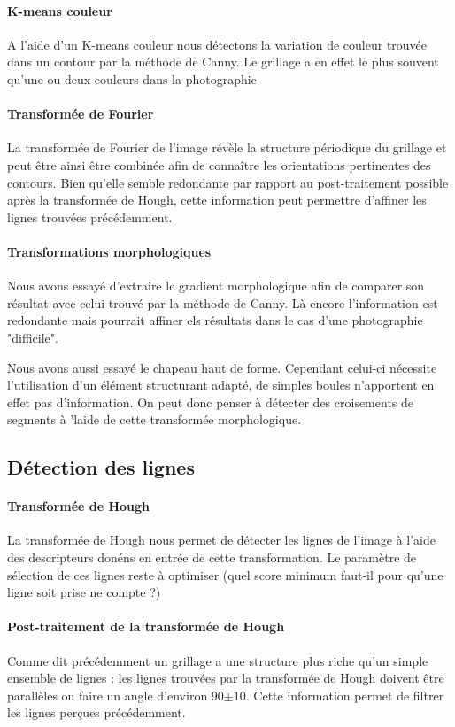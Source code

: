\documentclass[10pt,a4paper]{article}
\begin{document}
\paragraph{K-means couleur}
A l'aide d'un K-means couleur nous détectons la variation de couleur trouvée dans un contour par la méthode de Canny. Le grillage a en effet le plus souvent qu'une ou deux couleurs dans la photographie

\paragraph{Transformée de Fourier}
La transformée de Fourier de l'image révèle la structure périodique du grillage et peut être ainsi être combinée afin de connaître les orientations pertinentes des contours. Bien qu'elle semble redondante par rapport au post-traitement possible après la transformée de Hough, cette information peut permettre d'affiner les lignes trouvées précédemment.

\paragraph{Transformations morphologiques}
Nous avons essayé d'extraire le gradient morphologique afin de comparer son résultat avec celui trouvé par la méthode de Canny. Là encore l'information est redondante mais pourrait affiner els résultats dans le cas d'une photographie "difficile".

Nous avons aussi essayé le chapeau haut de forme. Cependant celui-ci nécessite l'utilisation d'un élément structurant adapté, de simples boules n'apportent en effet pas d'information. On peut donc penser à détecter des croisements de segments à 'laide de cette transformée morphologique.

\subsection{Détection des lignes}
\paragraph{Transformée de Hough}
La transformée de Hough nous permet de détecter les lignes de l'image à l'aide des descripteurs donéns en entrée de cette transformation. Le paramètre de sélection de ces lignes reste à optimiser (quel score minimum faut-il pour qu'une ligne soit prise ne compte ?)

\paragraph{Post-traitement de la transformée de Hough}
Comme dit précédemment un grillage a une structure plus riche qu'un simple ensemble de lignes : les lignes trouvées par la transformée de Hough doivent être parallèles ou faire un angle d'environ $90$\degre $\pm 10$\degre. Cette information permet de filtrer les lignes perçues précédemment.
\end{document}
